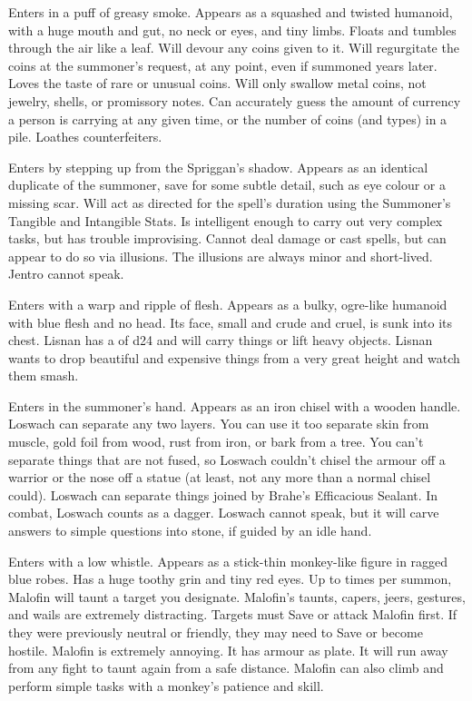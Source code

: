 {
Enters in a puff of greasy smoke. Appears as a squashed and twisted humanoid, with a huge mouth and gut, no neck or eyes, and tiny limbs. Floats and tumbles through the air like a leaf. Will devour any coins given to it. Will regurgitate the coins at the summoner's request, at any point, even if summoned years later. Loves the taste of rare or unusual coins. Will only swallow metal coins, not jewelry, shells, or promissory notes. Can accurately guess the amount of currency a person is carrying at any given time, or the number of coins (and types) in a pile. Loathes counterfeiters. 


Enters by stepping up from the Spriggan's shadow. Appears as an identical duplicate of the summoner, save for some subtle detail, such as eye colour or a missing scar. Will act as directed for the spell's duration using the Summoner's Tangible and Intangible Stats.  Is intelligent enough to carry out very complex tasks, but has trouble improvising. Cannot deal damage or cast spells, but can appear to do so via illusions. The illusions are always minor and short-lived.  Jentro cannot speak.


Enters with a warp and ripple of flesh. Appears as a bulky, ogre-like humanoid with blue flesh and no head. Its face, small and crude and cruel, is sunk into its chest. Lisnan has a \VIG of d24 and will carry things or lift heavy objects. Lisnan wants to drop beautiful and expensive things from a very great height and watch them smash.


Enters in the summoner's hand. Appears as an iron chisel with a wooden handle. Loswach can separate any two layers. You can use it too separate skin from muscle, gold foil from wood, rust from iron, or bark from a tree. You can't separate things that are not fused, so Loswach couldn't chisel the armour off a warrior or the nose off a statue (at least, not any more than a normal chisel could). Loswach can separate things joined by Brahe's Efficacious Sealant.  In combat, Loswach counts as a dagger. Loswach cannot speak, but it will carve answers to simple questions into stone, if guided by an idle hand.



Enters with a low whistle. Appears as a stick-thin monkey-like figure in ragged blue robes. Has a huge toothy grin and tiny red eyes. Up to \DICE times per summon, Malofin will taunt a target you designate. Malofin's taunts, capers, jeers, gestures, and wails are extremely distracting. Targets must Save or attack Malofin first. If they were previously neutral or friendly, they may need to Save or become hostile. Malofin is extremely annoying. It has armour as plate. It will run away from any fight to taunt again from a safe distance. Malofin can also climb and perform simple tasks with a monkey's patience and skill.

}
